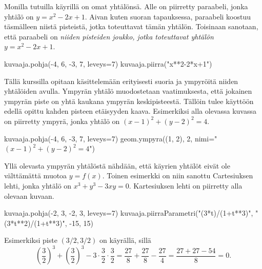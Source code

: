 Monilla tutuilla käyrillä on omat yhtälönsä.
Alle on piirretty paraabeli, jonka yhtälö on $y=x^2-2x+1$.
Aivan kuten suoran tapauksessa, paraabeli koostuu täsmälleen niistä pisteistä, jotka toteuttavat tämän yhtälön.
Toisinaan sanotaan, että paraabeli on \emph{niiden pisteiden joukko, jotka toteuttavat yhtälön $y=x^2-2x+1$}.


\begin{kuva}
	kuvaaja.pohja(-4, 6, -3, 7, leveys=7)
	kuvaaja.piirra("x**2-2*x+1")
\end{kuva}

Tällä kurssilla opitaan käsittelemään erityisesti suoria ja ympyröitä niiden yhtälöiden avulla.
Ympyrän yhtälö muodostetaan vaatimuksesta, että jokainen ympyrän piste on yhtä kaukana ympyrän keskipisteestä.
Tällöin tulee käyttöön edellä opittu kahden pisteen etäisyyden kaava.
Esimerkiksi alla olevassa kuvassa on piirretty ympyrä, jonka yhtälö on $(x-1)^2+(y-2)^2=4$.

\begin{kuva}
	kuvaaja.pohja(-4, 6, -3, 7, leveys=7)
	geom.ympyra((1, 2), 2, nimi="$(x-1)^2+(y-2)^2=4$")
\end{kuva}

Yllä olevasta ympyrän yhtälöstä nähdään, että käyrien yhtälöt eivät ole välttämättä muotoa $y=f(x)$.
Toinen esimerkki on niin sanottu Cartesiuksen lehti, jonka yhtälö on $x^3+y^3-3xy=0$.
Kartesiuksen lehti on piirretty alla olevaan kuvaan.

\begin{kuva}
	kuvaaja.pohja(-2, 3, -2, 3, leveys=7)
	kuvaaja.piirraParametri("(3*t)/(1+t**3)", "(3*t**2)/(1+t**3)", -15, 15)
\end{kuva}


Esimerkiksi piste $(3/2, 3/2)$ on käyrällä, sillä
\[
\left(\frac{3}{2}\right)^3+\left(\frac{3}{2}\right)^3-3\cdot\frac{3}{2}\cdot\frac{3}{2}
=\frac{27}{8}+\frac{27}{8}-\frac{27}{4}=\frac{27+27-54}{8}=0.
\]

